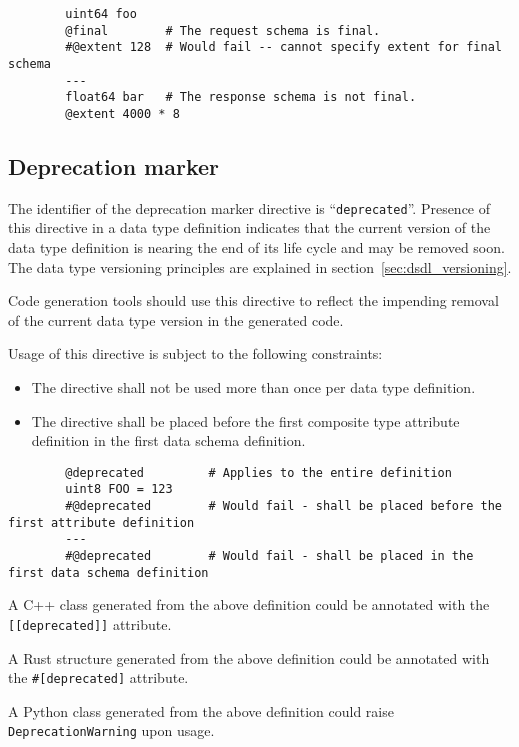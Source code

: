 \begin{remark}
    \begin{verbatim}
        uint64 foo
        @final        # The request schema is final.
        #@extent 128  # Would fail -- cannot specify extent for final schema
        ---
        float64 bar   # The response schema is not final.
        @extent 4000 * 8
    \end{verbatim}
\end{remark}

\subsection{Deprecation marker}

The identifier of the deprecation marker directive is ``\verb|deprecated|''.
Presence of this directive in a data type definition indicates that the current version of the data type definition
is nearing the end of its life cycle and may be removed soon.
The data type versioning principles are explained in section~\ref{sec:dsdl_versioning}.

Code generation tools should use this directive to reflect the impending removal of the current data type version
in the generated code.

Usage of this directive is subject to the following constraints:
\begin{itemize}
    \item The directive shall not be used more than once per data type definition.
    \item The directive shall be placed before the first composite type attribute definition in
          the first data schema definition.
\end{itemize}

\begin{remark}
    \begin{verbatim}
        @deprecated         # Applies to the entire definition
        uint8 FOO = 123
        #@deprecated        # Would fail - shall be placed before the first attribute definition
        ---
        #@deprecated        # Would fail - shall be placed in the first data schema definition
    \end{verbatim}

    A C++ class generated from the above definition could be annotated with the \verb|[[deprecated]]| attribute.

    A Rust structure generated from the above definition could be annotated with the \verb|#[deprecated]| attribute.

    A Python class generated from the above definition could raise \verb|DeprecationWarning| upon usage.
\end{remark}

